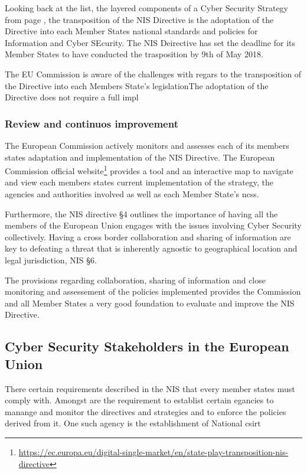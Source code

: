 Looking back at the list, the layered components of a Cyber Security Strategy from page \pageref{Successful_NCSS}, the transposition of the NIS Directive is the adoptation of the Directive into each Member States national standards and policies for Information and Cyber SEcurity. The NIS Deirective has set the deadline for its Member States to have conducted the trasposition by 9th of May 2018.

The EU Commission is aware of the challenges with regars to the transposition of the Directive into each Members State's legislationThe adoptation of the Directive does not require a full impl


\subsubsection{Review and continuos improvement}

The European Commission actively monitors and assesses each of its members states adaptation and implementation of the NIS Directive. The European Commission official website\footnote[3]{\url{https://ec.europa.eu/digital-single-market/en/state-play-transposition-nis-directive}} provides a tool and an interactive map to navigate and view each members states current implementation of the strategy, the agencies and authorities involved as well as each Member State's \acrshort{ncss}.

Furthermore, the NIS directive §4 outlines the importance of having all the members of the European Union engages with the issues involving Cyber Security collectively. Having a cross border collaboration and sharing of information are key to defeating a threat that is inherently agnostic to geographical location and legal jurisdiction, NIS §6. \cite{VIIRA2018} 

The provisions regarding collaboration, sharing of information and close monitoring and assessement of the policies implemented provides the Commission and all Member States a very good foundation to evaluate and improve the NIS Directive.


\subsection{Cyber Security Stakeholders in the European Union}

There certain requirements described in the NIS that every member states must comply with. Amongst are the requirement to establist certain egancies to manange and monitor the directives and strategies and to enforce the policies derived from it. One such agency is the establishment of National \acrfull{csirt}


